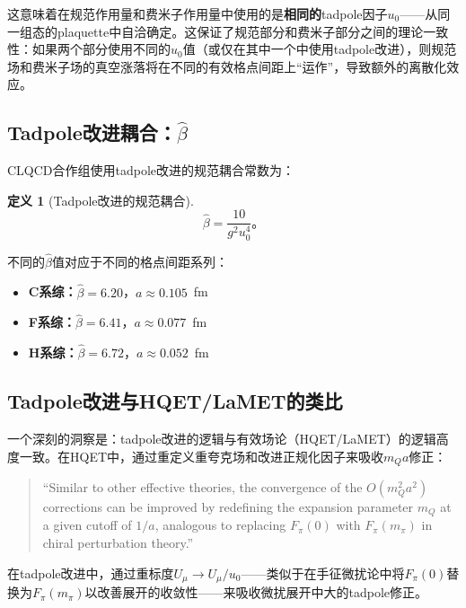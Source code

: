 \documentclass[12pt,a4paper]{ctexart}
\theoremstyle{definition}
\newtheorem{definition}{定义}[section]
\begin{document}
这意味着在规范作用量和费米子作用量中使用的是\textbf{相同的}tadpole因子$u_0$——从同一组态的plaquette中自洽确定。这保证了规范部分和费米子部分之间的理论一致性：如果两个部分使用不同的$u_0$值（或仅在其中一个中使用tadpole改进），则规范场和费米子场的真空涨落将在不同的有效格点间距上``运作''，导致额外的离散化效应。

\subsection{Tadpole改进耦合：$\hat{\beta}$}

CLQCD合作组使用tadpole改进的规范耦合常数为\cite{CLQCD2025quark_mass,CLQCD2024charm}：

\begin{definition}[Tadpole改进的规范耦合]
\begin{equation}
\boxed{\hat{\beta} = \frac{10}{g^2 u^4_0}}。
\label{eq:tadpole_beta}
\end{equation}
\end{definition}

不同的$\hat{\beta}$值对应于不同的格点间距系列：
\begin{itemize}
    \item \textbf{C系综：}$\hat{\beta}=6.20$，$a\approx0.105$~fm
    \item \textbf{F系综：}$\hat{\beta}=6.41$，$a\approx0.077$~fm
    \item \textbf{H系综：}$\hat{\beta}=6.72$，$a\approx0.052$~fm
\end{itemize}

\subsection{Tadpole改进与HQET/LaMET的类比}

一个深刻的洞察是\cite{CLQCD2024charm}：tadpole改进的逻辑与有效场论（HQET/LaMET）的逻辑高度一致。在HQET中，通过重定义重夸克场和改进正规化因子来吸收$m_Q a$修正\cite{CLQCD2024charm}：

\begin{quote}
``Similar to other effective theories, the convergence of the $O(m^2_Q a^2)$ corrections can be improved by redefining the expansion parameter $m_Q$ at a given cutoff of $1/a$, analogous to replacing $F_\pi(0)$ with $F_\pi(m_\pi)$ in chiral perturbation theory.''
\end{quote}

在tadpole改进中，通过重标度$U_\mu \to U_\mu/u_0$——类似于在手征微扰论中将$F_\pi(0)$替换为$F_\pi(m_\pi)$以改善展开的收敛性——来吸收微扰展开中大的tadpole修正。
\end{document}
